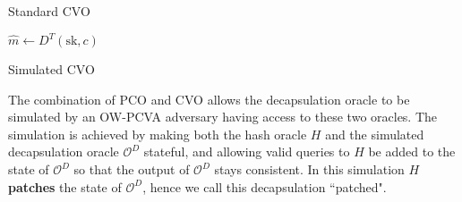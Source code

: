 \documentclass{article}
\begin{document}
\begin{multicols}{2}
    \begin{algorithm}[H]
        \SetAlgoLined
        \caption{Standard CVO}
        $\hat{m} \leftarrow D^T(\text{sk}, c)$\;
    \end{algorithm}
    \columnbreak

    \begin{algorithm}[H]
        \SetAlgoLined
        \caption{Simulated CVO}
    \end{algorithm}
\end{multicols}

The combination of PCO and CVO allows the decapsulation oracle to be simulated by an OW-PCVA adversary having access to these two oracles. The simulation is achieved by making both the hash oracle $H$ and the simulated decapsulation oracle $\mathcal{O}^D$ stateful, and allowing valid queries to $H$ be added to the state of $\mathcal{O}^D$ so that the output of $\mathcal{O}^D$ stays consistent. In this simulation $H$ \textbf{patches} the state of $\mathcal{O}^D$, hence we call this decapsulation ``patched".

\pagebreak
\end{document}
